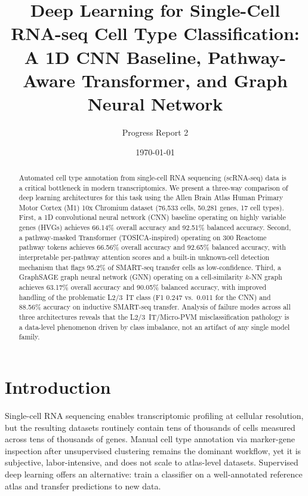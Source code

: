\documentclass[11pt,letterpaper]{article}
\title{Deep Learning for Single-Cell RNA-seq Cell Type Classification:\\
       A 1D CNN Baseline, Pathway-Aware Transformer, and Graph Neural Network}
\author{Progress Report 2}
\affil{Deep Learning Final Project}
\date{\today}
\begin{document}
\maketitle

\begin{abstract}
Automated cell type annotation from single-cell RNA sequencing (scRNA-seq) data
is a critical bottleneck in modern transcriptomics. We present a three-way
comparison of deep learning architectures for this task using the Allen Brain
Atlas Human Primary Motor Cortex (M1) 10x Chromium dataset (76,533 cells,
50,281 genes, 17 cell types). First, a 1D convolutional neural network (CNN)
baseline operating on highly variable genes (HVGs) achieves 66.14\% overall
accuracy and 92.51\% balanced accuracy. Second, a pathway-masked Transformer
(TOSICA-inspired) operating on 300 Reactome pathway tokens achieves 66.56\%
overall accuracy and 92.65\% balanced accuracy, with interpretable per-pathway
attention scores and a built-in unknown-cell detection mechanism that flags
95.2\% of SMART-seq transfer cells as low-confidence. Third, a GraphSAGE
graph neural network (GNN) operating on a cell-similarity $k$-NN graph achieves
63.17\% overall accuracy and 90.05\% balanced accuracy, with improved handling
of the problematic L2/3~IT class (F1 0.247 vs.\ 0.011 for the CNN) and 88.56\%
accuracy on inductive SMART-seq transfer. Analysis of failure modes across all
three architectures reveals that the L2/3~IT/Micro-PVM misclassification
pathology is a data-level phenomenon driven by class imbalance, not an artifact
of any single model family.
\end{abstract}

\section{Introduction}

Single-cell RNA sequencing enables transcriptomic profiling at cellular
resolution, but the resulting datasets routinely contain tens of thousands of
cells measured across tens of thousands of genes. Manual cell type annotation
via marker-gene inspection after unsupervised clustering remains the dominant
workflow, yet it is subjective, labor-intensive, and does not scale to atlas-level
datasets. Supervised deep learning offers an alternative: train a classifier on
a well-annotated reference atlas and transfer predictions to new data.
\end{document}
